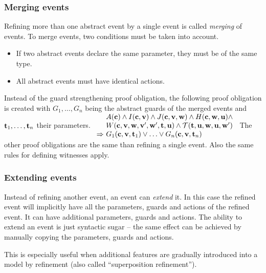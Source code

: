 \subsubsection{Merging events}
\label{merging_events}
Refining more than one abstract event by a single event is called \emph{merging} of events.
To merge events, two conditions must be taken into account.
\begin{itemize}
\item If two abstract events declare the same parameter, they must be of the same type.
\item All abstract events must have identical actions.
\end{itemize}
Instead of the guard strengthening proof obligation, the following proof obligation is
created with $G_1,\ldots,G_n$ being the abstract guards of the merged events
  and $\mathbf{t}_1,\ldots,\mathbf{t}_n$ their parameters.
%
  {$\begin{array}{l@{\ }l}
      & \axioms \land \absinvariants \land \concinvariants \land
      \concguards \land \\
      & \witnesspred \land \bapred \\
      \limp & G_1(\allconstants,\absvariables,\absparameters_1)\lor\ldots\lor G_n(\allconstants,\absvariables,\absparameters_n)      
    \end{array}
$}
The other proof obligations are the same than refining a single event.
Also the same rules for defining witnesses apply.

\subsubsection{Extending events}
\label{extending_events}
Instead of refining another event, an event can \emph{extend} it.
In this case the refined event will implicitly have all the parameters, 
 guards and actions of the refined event. It can have additional parameters,
 guards and actions.
The ability to extend an event is just syntactic sugar -- the same effect
 can be achieved by manually copying the parameters, guards and actions.

This is especially useful when additional features are gradually introduced
 into a model by refinement (also called ``superposition refinement'').

